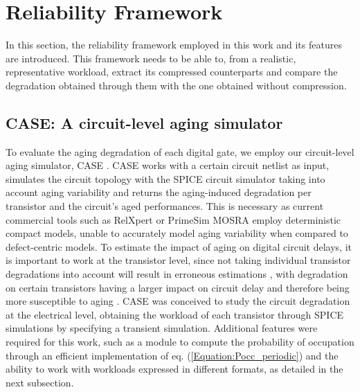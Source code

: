 \section{Reliability Framework}

\label{section:Framework}
In this section, the reliability framework employed in this work and its features are introduced. This framework needs to be able to, from a realistic, representative workload, extract its compressed counterparts and compare the degradation obtained through them with the one obtained without compression.

\subsection{CASE: A circuit-level aging simulator}

To evaluate the aging degradation of each digital gate, we employ our circuit-level aging simulator, CASE \cite{martin-lloretCASEReliabilitySimulation2017}. CASE works with a certain circuit netlist as input, simulates the circuit topology with the SPICE circuit simulator taking into account aging variability and returns the aging-induced degradation per transistor and the circuit's aged performances. This is necessary as current commercial tools such as RelXpert \cite{CadenceReliability} or PrimeSim MOSRA \cite{SynopsysReliability} employ deterministic compact models, unable to accurately model aging variability when compared to defect-centric models. To estimate the impact of aging on digital circuit delays, it is important to work at the transistor level, since not taking individual transistor degradations into account will result in erroneous estimations \cite{khanBTIImpactLogical2012, vansantenModelingMitigatingTimeDependent2019, vansantenNewWorstcaseTiming2019}, with degradation on certain transistors having a larger impact on circuit delay and therefore being more susceptible to aging \cite{mohamedGraphAttentionNetworks2024}. CASE was conceived to study the circuit degradation at the electrical level, obtaining the workload of each transistor through SPICE simulations by specifying a transient simulation. Additional features were required for this work, such as a module to compute the probability of occupation through an efficient implementation of eq. (\ref{Equation:Pocc_periodic}) and the ability to work with workloads expressed in different formats, as detailed in the next subsection. 




